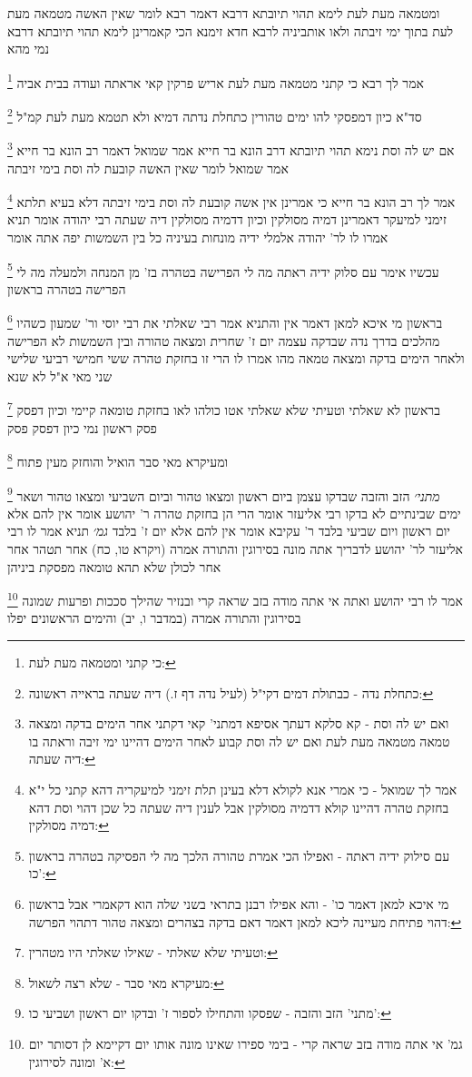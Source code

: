 \documentclass[12pt, openany]{book}
\newcommand{\footnotecomment}[1]{
	\renewcommand\thefootnote{}
	\footnote{#1}}
\newcommand{\commenta}[1]{\footnotecomment{#1}}
\begin{document}
{ומטמאה מעת לעת לימא תהוי תיובתא דרבא דאמר רבא לומר שאין האשה מטמאה מעת לעת בתוך ימי זיבתה 
ולאו אותביניה לרבא חדא זימנא הכי קאמרינן לימא תהוי תיובתא דרבא נמי מהא 
\commenta{כי קתני ומטמאה מעת לעת:}
אמר לך רבא כי קתני מטמאה מעת לעת אריש פרקין קאי אראתה ועודה בבית אביה 
\commenta{כתחלת נדה - כבתולת דמים דקי"ל (לעיל נדה דף ז.) דיה שעתה בראייה ראשונה:}
סד"א כיון דמפסקי להו ימים טהורין כתחלת נדתה דמיא ולא תטמא מעת לעת קמ"ל
\commenta{ואם יש לה וסת - קא סלקא דעתך אסיפא דמתני' קאי דקתני אחר הימים בדקה ומצאה טמאה מטמאה מעת לעת ואם יש לה וסת קבוע לאחר הימים דהיינו ימי זיבה וראתה בו דיה שעתה:}
אם יש לה וסת נימא תהוי תיובתא דרב הונא בר חייא אמר שמואל דאמר רב הונא בר חייא אמר שמואל לומר שאין האשה קובעת לה וסת בימי זיבתה 
\commenta{אמר לך שמואל - כי אמרי אנא לקולא דלא בעינן תלת זימני למיעקריה דהא קתני כל י"א בחזקת טהרה דהיינו קולא דדמיה מסולקין אבל לענין דיה שעתה כל שכן דהוי וסת דהא דמיה מסולקין:}
אמר לך רב הונא בר חייא כי אמרינן אין אשה קובעת לה וסת בימי זיבתה דלא בעיא תלתא זימני למיעקר דאמרינן דמיה מסולקין וכיון דדמיה מסולקין דיה שעתה
רבי יהודה אומר תניא אמרו לו לר' יהודה אלמלי ידיה מונחות בעיניה כל בין השמשות יפה אתה אומר
\commenta{עם סילוק ידיה ראתה - ואפילו הכי אמרת טהורה הלכך מה לי הפסיקה בטהרה בראשון כו':}
עכשיו אימר עם סלוק ידיה ראתה מה לי הפרישה בטהרה בז' מן המנחה ולמעלה מה לי הפרישה בטהרה בראשון 
\commenta{מי איכא למאן דאמר כו' - והא אפילו רבנן בתראי בשני שלה הוא דקאמרי אבל בראשון דהוי פתיחת מעיינה ליכא למאן דאמר דאם בדקה בצהרים ומצאה טהור דתהוי הפרשה:}
בראשון מי איכא למאן דאמר 
אין והתניא אמר רבי שאלתי את רבי יוסי ור' שמעון כשהיו מהלכים בדרך נדה שבדקה עצמה יום ז' שחרית ומצאה טהורה ובין השמשות לא הפרישה ולאחר הימים בדקה ומצאה טמאה מהו 
אמרו לו הרי זו בחזקת טהרה ששי חמישי רביעי שלישי שני מאי א"ל לא שנא 
\commenta{וטעיתי שלא שאלתי - שאילו שאלתי היו מטהרין:}
בראשון לא שאלתי וטעיתי שלא שאלתי אטו כולהו לאו בחזקת טומאה קיימי וכיון דפסק פסק ראשון נמי כיון דפסק פסק 
\commenta{מעיקרא מאי סבר - שלא רצה לשאול:}
ומעיקרא מאי סבר הואיל והוחזק מעין פתוח
\commenta{מתני' הזב והזבה - שפסקו והתחילו לספור ז' ובדקו יום ראשון ושביעי כו':}
{\large\emph{מתני׳}} הזב והזבה שבדקו עצמן ביום ראשון ומצאו טהור וביום השביעי ומצאו טהור ושאר ימים שבינתיים לא בדקו רבי אליעזר אומר הרי הן בחזקת טהרה ר' יהושע אומר אין להם אלא יום ראשון ויום שביעי בלבד ר' עקיבא אומר אין להם אלא יום ז' בלבד
{\large\emph{גמ׳}} תניא אמר לו רבי אליעזר לר' יהושע לדבריך אתה מונה בסירוגין והתורה אמרה (ויקרא טו, כח) אחר תטהר אחר אחר לכולן שלא תהא טומאה מפסקת ביניהן 
\commenta{גמ' אי אתה מודה בזב שראה קרי - בימי ספירו שאינו מונה אותו יום דקיימא לן דסותר יום א' ומונה לסירוגין:}
אמר לו רבי יהושע ואתה אי אתה מודה בזב שראה קרי ובנזיר שהילך סככות ופרעות שמונה בסירוגין והתורה אמרה (במדבר ו, יב) והימים הראשונים יפלו 
}
\end{document}
